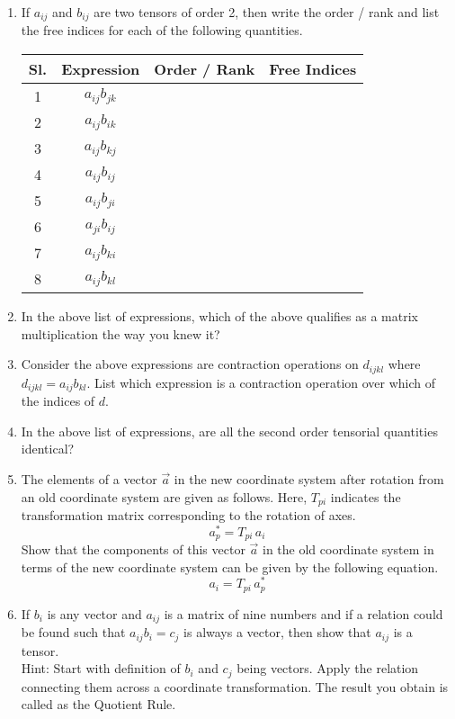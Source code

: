 \begin{enumerate}{}{}

\item If $a_{ij}$ and $b_{ij}$ are two tensors of order 2, then write the order / rank and list the free indices for each of the following quantities.

\begin{tabular}{| c | c | m{1 in} | m{1 in} |}
\hline
 Sl. & Expression & Order / Rank & Free Indices \\[1 cm]
\hline
1 & $a_{ij} b_{jk}$ & & \\[1 cm]
\hline
2 & $a_{ij} b_{ik}$ & & \\[1 cm]
\hline
3 & $a_{ij} b_{kj}$ & & \\[1 cm]
\hline
4 & $a_{ij} b_{ij}$ & & \\[1 cm]
\hline
5 & $a_{ij} b_{ji}$ & & \\[1 cm]
\hline
6 & $a_{ji} b_{ij}$ & & \\[1 cm]
\hline
7 & $a_{ij} b_{ki}$ & & \\[1 cm]
\hline
8 & $a_{ij} b_{kl}$ & & \\[1 cm]
\hline
\end{tabular}

\item In the above list of expressions, which of the above qualifies as a matrix multiplication the way you knew it?

\item Consider the above expressions are contraction operations on $d_{ijkl}$ where $d_{ijkl} = a_{ij} b_{kl}$. List which expression is a contraction operation over which of the indices of $d$.

\item In the above list of expressions, are all the second order tensorial quantities identical?

\item The elements of a vector $\vec{a}$ in the new coordinate system after rotation from an old coordinate system are given as follows. Here, $T_{pi}$ indicates the transformation matrix corresponding to the rotation of axes. 
$$ a^*_p = T_{pi} \, a_i$$ 
Show that the components of this vector $\vec{a}$ in the old coordinate system in terms of the new coordinate system can be given by the following equation.
$$ a_i = T_{pi} \, a^*_p$$ 

\item If $b_i$ is any vector and $a_{ij}$ is a matrix of nine numbers and if a relation could be found such that $a_{ij} b_i = c_j$ is always a vector, then show that $a_{ij}$ is a tensor.\\
Hint: Start with definition of $b_i$ and $c_j$ being vectors. Apply the relation connecting them across a coordinate transformation. The result you obtain is called as the Quotient Rule.


\end{enumerate}
